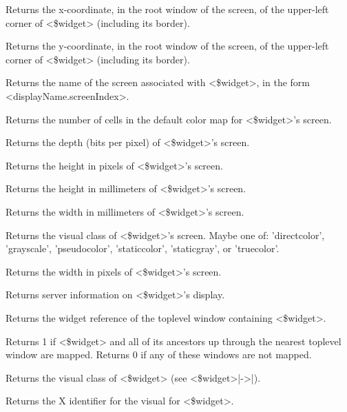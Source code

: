 \begin{enum}{1cm}
Returns the x-coordinate, in the root window of the screen, of the
upper-left corner of <\$widget> (including its border).

Returns the y-coordinate, in the root window of the screen, of the
upper-left corner of <\$widget> (including its border).

Returns the name of the screen associated with <\$widget>, in the form
<displayName.screenIndex>.

Returns the number of cells in the default color map for <\$widget>'s
screen.

Returns the depth (bits per pixel) of <\$widget>'s screen.

Returns the height in pixels of <\$widget>'s screen.

Returns the height in millimeters of <\$widget>'s screen.

Returns the width in millimeters of <\$widget>'s screen.

Returns the visual class of <\$widget>'s screen. Maybe one of: 'directcolor',
'grayscale', 'pseudocolor', 'staticcolor', 'staticgray', or 'truecolor'.

Returns the width in pixels of <\$widget>'s screen.

Returns server information on <\$widget>'s display.

Returns the widget reference of the toplevel window containing <\$widget>.

Returns 1 if <\$widget> and all of its ancestors up through the nearest toplevel
window are mapped. Returns 0 if any of these windows are not mapped. 

Returns the visual class of <\$widget> (see <\$widget>|->|).

Returns the X identifier for the visual for <\$widget>. 


\end{enum}
